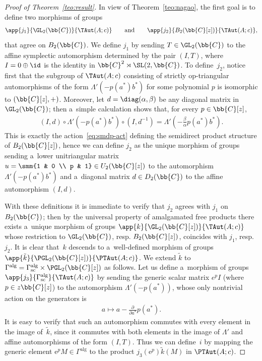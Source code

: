 \begin{proof}[Proof of Theorem~\ref{teo:result}]
In view of Theorem~\ref{teo:nagao}, the f\/irst goal is to def\/ine two
morphisms of groups
\begin{gather*}
\app{j_{1}}{\GL_{2}(\bb{C})}{\TAut(A;c)}
\qquad
\text{and} %
\qquad
\app{j_{2}}{B_{2}(\bb{C}[z])}{\TAut(A;c)},
\end{gather*}
that agree on \(B_{2}(\bb{C})\).
We def\/ine \(j_{1}\) by sending \(T\in \GL_{2}(\bb{C})\) to the af\/f\/ine symplectic automorphism
determined by the pair \((I,T)\), where \(I = 0\oplus \id\) is the identity in \(\bb{C}^{2}\rtimes
\SL(2,\bb{C})\).
To def\/ine~\(j_{2}\), notice f\/irst that the subgroup of \(\TAut(A;c)\) consisting of strictly
op-triangular automorphisms of the form \(\Lambda'(-p(a^{*})b^{*})\) for some polynomial \(p\) is
isomorphic to \((\bb{C}[z],+)\).
Moreover, let \(d = \diag(\alpha,\beta)\) be any diagonal matrix in \(\GL_{2}(\bb{C})\); then a~simple
calculation shows that, for every \(p\in \bb{C}[z]\),
\begin{gather*}%
(I,d)\circ\Lambda'(-p(a^{*})b^{*})\circ(I,d^{-1})=\Lambda'\left(-\frac{\beta}{\alpha}p(a^{*})b^{*}\right).
\end{gather*}
This is exactly the action~\eqref{eq:smdp-act} def\/ining the semidirect product structure of
\(B_{2}(\bb{C}[z])\), hence we can def\/ine \(j_{2}\) as the unique morphism of groups sending a~lower
unitriangular matrix \(u = \smm{1 & 0
\\
p & 1}\in U_{2}(\bb{C}[z])\) to the automorphism \(\Lambda'(-p(a^{*})b^{*})\) and a~diagonal matrix \(d\in
D_{2}(\bb{C})\) to the af\/f\/ine automorphism \((I,d)\).

With these def\/initions it is immediate to verify that \(j_{2}\) agrees with \(j_{1}\) on
\(B_{2}(\bb{C})\); then by the universal property of amalgamated free products there exists a~unique
morphism of groups \(\app{k}{\GL_{2}(\bb{C}[z])}{\TAut(A;c)}\) whose restriction to \(\GL_{2}(\bb{C})\),
resp.
\(B_{2}(\bb{C}[z])\), coincides with \(j_{1}\), resp.~\(j_{2}\).
It is clear that~\(k\) descends to a~well-def\/ined morphism of groups
\(\app{\tilde{k}}{\PGL_{2}(\bb{C}[z])}{\PTAut(A;c)}\).
We extend \(\tilde{k}\) to \(\Gamma^{\mathrm{alg}} = \Gamma^{\mathrm{alg}}_{\mathrm{sc}} \times
\PGL_{2}(\bb{C}[z])\) as follows.
Let us def\/ine a~morphism of groups \(\app{j_{3}}{\Gamma^{\mathrm{alg}}_{\mathrm{sc}}}{\TAut(A;c)}\) by
sending the generic scalar matrix \(e^{p}I\) (where \(p\in z\bb{C}[z]\)) to the automorphism
\(\Lambda'(-p(a^{*}))\), whose only nontrivial action on the generators is
\begin{gather}
\label{eq:sc-au}
a\mapsto a-\frac{\partial}{\partial a^{*}}p(a^{*}).
\end{gather}
It is easy to verify that such an automorphism commutes with every element in the image of~\(\tilde{k}\),
since it commutes with both elements in the image of \(\Lambda'\) and af\/f\/ine automorphisms of the form
\((I,T)\).
Thus we can def\/ine~\(i\) by mapping the generic element \(\mathrm{e}^{p}M\in \Gamma^{\mathrm{alg}}\) to
the product \(j_{3}(\mathrm{e}^{p}) \tilde{k}(M)\) in \(\PTAut(A;c)\).


\end{proof}
